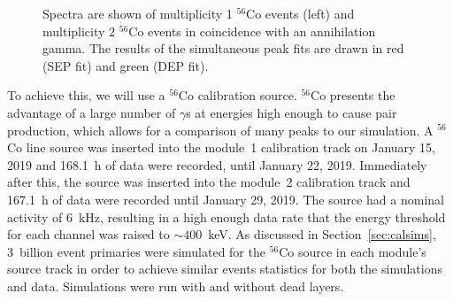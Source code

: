 \documentclass[notitlepage,rmp,aps,10pt]{revtex4-1}
\newcommand{\iso}[2]{$^{#1}$#2}
\newcommand{\Co}[1]{\iso{#1}{Co}}
\begin{document}
\begin{figure}[t]
  \centering
  \caption[Spectra of multiplicty 1 and 2 \Co{56} data with peak fits]{\label{fig:Co56Spectra}
    Spectra are shown of multiplicity 1 \Co{56} events (left) and multiplicity 2 \Co{56} events in coincidence with an annihilation gamma. The results of the simultaneous peak fits are drawn in red (SEP fit) and green (DEP fit).
  }
\end{figure}
To achieve this, we will use a \Co{56} calibration source.
\Co{56} presents the advantage of a large number of $\gamma$s at energies high enough to cause pair production, which allows for a comparison of many peaks to our simulation.
A \Co{56} line source was inserted into the module~1 calibration track on January 15, 2019 and 168.1~h of data were recorded, until January 22, 2019.
Immediately after this, the source was inserted into the module~2 calibration track and 167.1~h of data were recorded until January 29, 2019.
The source had a nominal activity of 6~kHz, resulting in a high enough data rate that the energy threshold for each channel was raised to ${\sim}400$~keV.
As discussed in Section~\ref{sec:calsims}, 3~billion event primaries were simulated for the \Co{56} source in each module's source track in order to achieve similar events statistics for both the simulations and data.
Simulations were run with and without dead layers.
\end{document}
